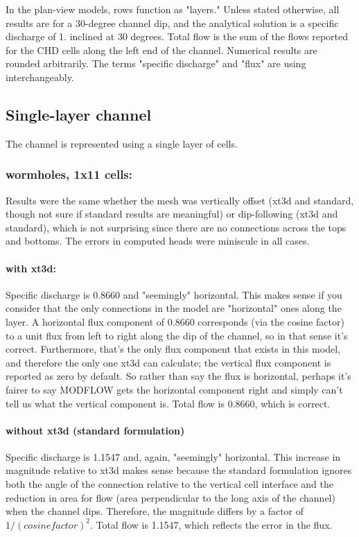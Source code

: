 \documentclass{article}
\begin{document}
In the plan-view models, rows function as "layers." Unless stated otherwise, all results are for a 30-degree channel dip, and the analytical solution is a specific discharge of 1. inclined at 30 degrees. Total flow is the sum of the flows reported for the CHD cells along the left end of the channel. Numerical results are rounded arbitrarily. The terms "specific discharge" and "flux" are using interchangeably.

\subsection{Single-layer channel}
The channel is represented using a single layer of cells.

\subsubsection{wormholes, 1x11 cells:}
Results were the same whether the mesh was vertically offset (xt3d and standard, though not sure if standard results are meaningful) or dip-following (xt3d and standard), which is not surprising since there are no connections across the tops and bottoms. The errors in computed heads were miniscule in all cases.

\paragraph{with xt3d:} Specific discharge is 0.8660 and "seemingly" horizontal. This makes sense if you consider that the only connections in the model are "horizontal" ones along the layer. A horizontal flux component of 0.8660 corresponds (via the cosine factor) to a unit flux from left to right along the dip of the channel, so in that sense it's correct. Furthermore, that's the only flux component that exists in this model, and therefore the only one xt3d can calculate; the vertical flux component is reported as zero by default. So rather than say the flux is horizontal, perhaps it's fairer to say MODFLOW gets the horizontal component right and simply can't tell us what the vertical component is. Total flow is 0.8660, which is correct.

\paragraph{without xt3d (standard formulation)} Specific discharge is 1.1547 and, again, "seemingly" horizontal. This increase in magnitude relative to xt3d makes sense because the standard formulation ignores both the angle of the connection relative to the vertical cell interface and the reduction in area for flow (area perpendicular to the long axis of the channel) when the channel dips. Therefore, the  magnitude differs by a factor of $1/{(cosine factor)}^2$. Total flow is 1.1547, which reflects the error in the flux.
\end{document}
